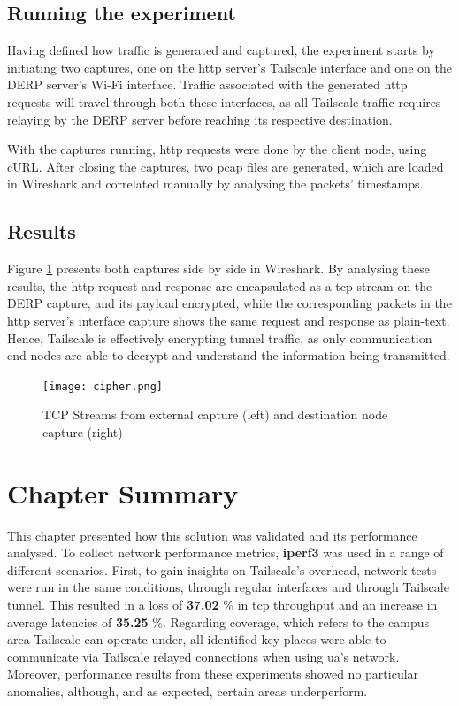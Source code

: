 \documentclass[11pt,twoside,a4paper]{report}
\begin{document}
\subsection{Running the experiment}

Having defined how traffic is generated and captured, the experiment starts by initiating two captures, one on the \ac{http} server's Tailscale interface and one on the \ac{DERP} server's Wi-Fi interface. Traffic associated with the generated \ac{http} requests will travel through both these interfaces, as all Tailscale traffic requires relaying by the \ac{DERP} server before reaching its respective destination.

With the captures running, \ac{http} requests were done by the client node, using cURL. After closing the captures, two pcap files are generated, which are loaded in Wireshark and correlated manually by analysing the packets' timestamps.

\subsection{Results}

Figure \ref{fig:cipher} presents both captures side by side in Wireshark. By analysing these results, the \ac{http} request and response are encapsulated as a \ac{tcp} stream on the \ac{DERP} capture, and its payload encrypted, while the corresponding packets in the \ac{http} server's interface capture shows the same request and response as plain-text. Hence, Tailscale is effectively encrypting tunnel traffic, as only communication end nodes are able to decrypt and understand the information being transmitted.

\begin{figure}[h]
\centering
  \texttt{[image: cipher.png]}
  \caption{TCP Streams from external capture (left) and destination node capture (right)}
  \label{fig:cipher}
\end{figure}

\section{Chapter Summary}

This chapter presented how this solution was validated and its performance analysed. To collect network performance metrics, \textbf{iperf3} was used in a range of different scenarios. First, to gain insights on Tailscale's overhead, network tests were run in the same conditions, through regular interfaces and through Tailscale tunnel. This resulted in a loss of \textbf{37.02} \% in \ac{tcp} throughput and an increase in average latencies of \textbf{35.25} \%. Regarding coverage, which refers to the campus area Tailscale can operate under, all identified key places were able to communicate via Tailscale relayed connections when using \ac{ua}'s network. Moreover, performance results from these experiments showed no particular anomalies, although, and as expected, certain areas underperform.
\end{document}
